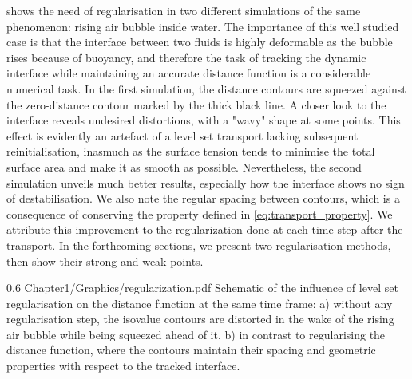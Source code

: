  shows the need of regularisation in two different 
simulations of the same phenomenon: rising air bubble inside
water. The importance of this well studied case \citep{sussman_level_1994,hysing_quantitative_2009}
is that the interface between two fluids is highly deformable
as the bubble rises because of buoyancy, and therefore the task of tracking the 
dynamic interface while maintaining an accurate distance function
is a considerable numerical task. In the first simulation, the distance contours 
are squeezed against the zero-distance contour marked by the 
thick black line. A closer look to the interface reveals undesired distortions, with a 
"wavy" shape at some points. This effect is evidently an artefact
of a level set transport lacking subsequent reinitialisation, inasmuch 
as the surface tension tends to minimise the total surface area and make it as smooth
as possible. Nevertheless, the second simulation unveils much better results, especially 
how the interface shows no sign of destabilisation. We also note the regular spacing between contours,
which is a consequence of conserving the property defined in \cref{eq:transport_property}.
We attribute this improvement to the regularization done at each time step after the transport.
In the forthcoming sections, we present two regularisation methods, then show their strong and weak points.
\begin{figureth}
{0.6}
{Chapter1/Graphics/regularization.pdf}
{Schematic of the influence of level set regularisation on the distance function at the same time frame: 
a) without any regularisation step, the isovalue contours are distorted in the wake of the rising air 
bubble while being squeezed ahead of it, 
b) in contrast to regularising the distance function, where the contours maintain their spacing and geometric 
properties with respect to the tracked interface.}
\label{fig:reinit_influence}
\end{figureth}
%
